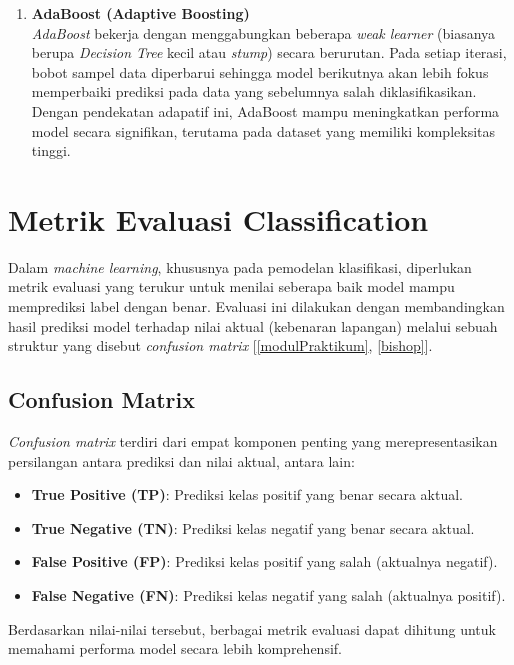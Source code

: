 \documentclass[a4paper,oneside,11pt]{book}
\begin{document}
\begin{enumerate}
    \item \textbf{AdaBoost (Adaptive Boosting)}\\
    \textit{AdaBoost} bekerja dengan menggabungkan beberapa \textit{weak learner} (biasanya berupa \textit{Decision Tree} kecil atau \textit{stump}) secara berurutan. Pada setiap iterasi, bobot sampel data diperbarui sehingga model berikutnya akan lebih fokus memperbaiki prediksi pada data yang sebelumnya salah diklasifikasikan. Dengan pendekatan adapatif ini, AdaBoost mampu meningkatkan performa model secara signifikan, terutama pada dataset yang memiliki kompleksitas tinggi.
\end{enumerate}

\section{Metrik Evaluasi Classification}
Dalam \textit{machine learning}, khususnya pada pemodelan klasifikasi, diperlukan metrik evaluasi yang terukur untuk menilai seberapa baik model mampu memprediksi label dengan benar. Evaluasi ini dilakukan dengan membandingkan hasil prediksi model terhadap nilai aktual (kebenaran lapangan) melalui sebuah struktur yang disebut \textit{confusion matrix} [\ref{modulPraktikum}, \ref{bishop}].

\subsection{Confusion Matrix}
\textit{Confusion matrix} terdiri dari empat komponen penting yang merepresentasikan persilangan antara prediksi dan nilai aktual, antara lain:
\begin{itemize}
    \item \textbf{True Positive (TP)}: Prediksi kelas positif yang benar secara aktual.
    \item \textbf{True Negative (TN)}: Prediksi kelas negatif yang benar secara aktual.
    \item \textbf{False Positive (FP)}: Prediksi kelas positif yang salah (aktualnya negatif).
    \item \textbf{False Negative (FN)}: Prediksi kelas negatif yang salah (aktualnya positif).
\end{itemize}
Berdasarkan nilai-nilai tersebut, berbagai metrik evaluasi dapat dihitung untuk memahami performa model secara lebih komprehensif.
\end{document}
